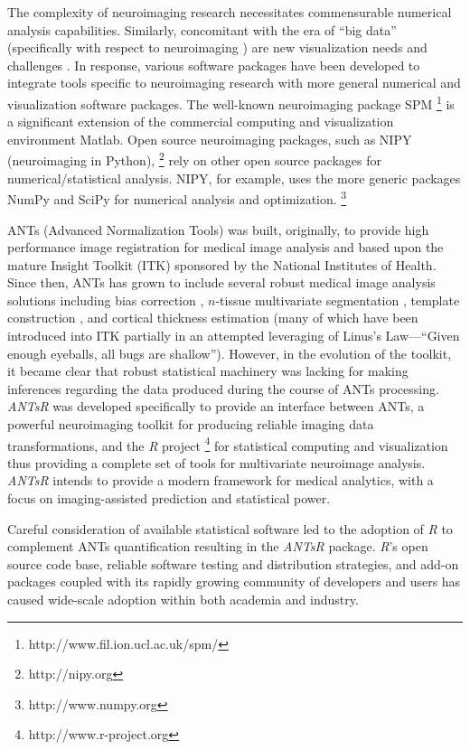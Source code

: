 \documentclass[preprint,authoryear,review,12pt]{elsarticle}
\begin{document}
The complexity of neuroimaging research necessitates 
commensurable numerical analysis capabilities.  Similarly, concomitant
with the era of ``big data'' (specifically with respect to neuroimaging
\citep{vanhorn2013}) are new visualization needs and challenges
\citep{childs2013,kehrer2013}.
In response, various software packages have been developed to
integrate tools specific to neuroimaging research with more general
numerical and visualization software packages.
The well-known neuroimaging package SPM%
\footnote{
http://www.fil.ion.ucl.ac.uk/spm/
}
is a significant extension of the commercial computing and visualization environment
Matlab.  Open source neuroimaging packages, such as NIPY (neuroimaging in Python),%
\footnote{
http://nipy.org
} 
rely on other open source packages for numerical/statistical analysis.  NIPY,
for example, uses the more generic packages NumPy and SciPy for numerical analysis and 
optimization.%
\footnote{
http://www.numpy.org
}  

ANTs (Advanced Normalization Tools) was built, originally, to provide 
high performance image registration for medical image analysis
\citep{avants2008a} and based upon the mature Insight Toolkit (ITK)
sponsored by the National Institutes of Health.  Since then, ANTs has grown to include 
several robust medical image analysis solutions including bias 
correction \citep{tustison2010}, $n$-tissue multivariate segmentation 
\citep{avants2011}, template construction \citep{avants2010}, and cortical 
thickness estimation \citep{das2009} (many of which have been
introduced into ITK partially in an attempted leveraging of Linus's Law---``Given enough eyeballs, all bugs are shallow'').  
However, in the evolution of the toolkit, it became clear 
that robust statistical machinery was lacking for making inferences regarding
the data produced during the course of ANTs processing.  \textit{ANTsR} was developed
specifically to provide an interface between ANTs, a 
powerful neuroimaging toolkit for producing reliable imaging data 
transformations, and the \textit{R} project%
\footnote{
http://www.r-project.org
}
for statistical computing and visualization thus providing a complete
set of tools for multivariate neuroimage analysis.  
 \textit{ANTsR} intends to provide a modern framework for medical analytics, 
 with a focus on imaging-assisted prediction and statistical power.


Careful consideration of available statistical software 
led to the adoption of \textit{R} to complement ANTs quantification resulting in the
\textit{ANTsR} package.
\textit{R}'s open source code base, reliable software testing and distribution strategies,
and add-on packages coupled with its rapidly growing 
community of developers and users has caused wide-scale
adoption within both academia and industry.
\end{document}
